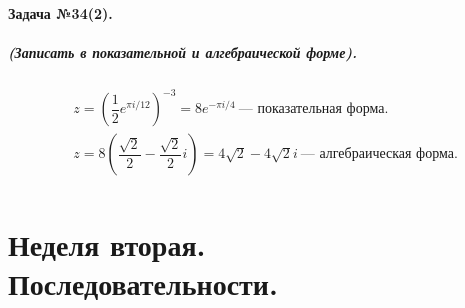 \documentclass[a4paper,12pt]{report}
\begin{document}
\paragraph{Задача №34(2).}
\subparagraph{(Записать в показательной и алгебраической форме).}

\begin{align*}
	&z=\left(\dfrac{1}{2}e^{\pi i/12}\right)^{-3}=
	8e^{-\pi i/4}~\text{--- показательная форма.}\\
	&z=8\left(\dfrac{\sqrt{2}}{2}-\dfrac{\sqrt{2}}{2}i\right)=
	4\sqrt{2}-4\sqrt{2}i~\text{--- алгебраическая форма.}\\
\end{align*}

\section*{Неделя вторая.\\ Последовательности.}
\end{document}
